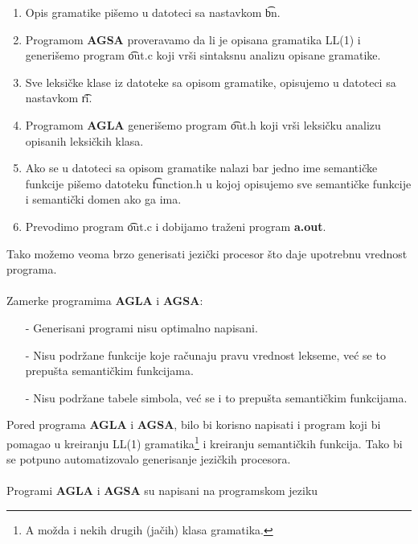     \begin{enumerate}
      \item
      {
        Opis gramatike pi\v semo u datoteci sa nastavkom \t{bn}.
      }
      \item
      {
        Programom {\bf AGSA} proveravamo da li je opisana gramatika LL(1) i
        generi\-\v semo program \t{out.c} koji vr\v si sintaksnu analizu
        opisane gramatike.
      }
      \item
      {
        Sve leksi\v cke klase iz datoteke sa opisom gramatike, opisujemo
        u datoteci sa nastavkom \t{ri}.
      }
      \item
      {
        Programom {\bf AGLA} generi\v semo program \t{out.h} koji vr\v si
        leksi\v cku analizu opisanih leksi\v ckih klasa.
      }
      \item
      {
        Ako se u datoteci sa opisom gramatike nalazi bar jedno ime
        semanti\v cke funkcije pi\v semo datoteku \t{function.h} u kojoj
        opisujemo sve semanti\v cke funkcije i semanti\v cki domen ako
        ga ima.
      }
      \item
      {
        Prevodimo program \t{out.c} i dobijamo tra\v zeni program
        {\bf a.out}.
      }
    \end{enumerate}
    Tako mo\v zemo veoma brzo generisati jezi\v cki procesor \v sto daje
    upotrebnu vrednost programa.\\
    \\
    Zamerke programima {\bf AGLA} i {\bf AGSA}:
    \begin{itemize}
      \item[-]
      {
        Generisani programi nisu optimalno napisani.
      }
      \item[-]
      {
        Nisu podr\v zane funkcije koje ra\v cunaju pravu vrednost lekseme,
        ve\'c se to prepu\v sta semanti\v ckim funkcijama.
      }
      \item[-]
      {
        Nisu podr\v zane tabele simbola, ve\'c se i to prepu\v sta
        semanti\v ckim funkcijama.
      }
    \end{itemize}
    Pored programa {\bf AGLA} i {\bf AGSA}, bilo bi korisno napisati i
    program koji bi pomagao u kreiranju LL(1) gramatika\footnote{A mo\v zda
    i nekih drugih (ja\v cih) klasa gramatika.} i kreiranju semanti\v ckih
    funkcija.
    Tako bi se potpuno automatizovalo generisanje jezi\v ckih procesora.\\
    \\
    Programi {\bf AGLA} i {\bf AGSA} su napisani na programskom jeziku
